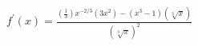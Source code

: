 $ \displaystyle f^{\prime}(x) = \frac{ \left(\frac{1}{3}\right)x^{-2/3}(3x^2) - (x^3 - 1)(\sqrt[3]{x})}{ (\sqrt[3]{x})^2} $